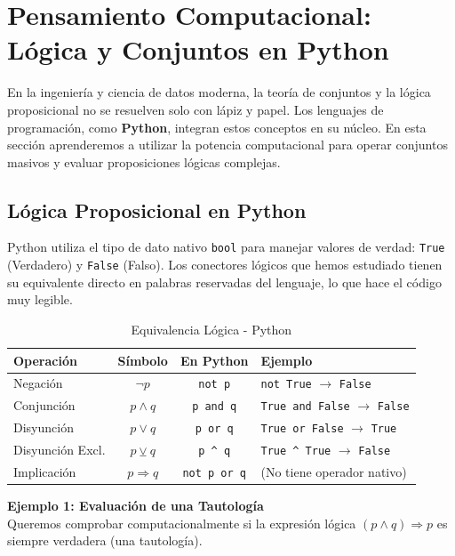 \section{Pensamiento Computacional: Lógica y Conjuntos en Python}

En la ingeniería y ciencia de datos moderna, la teoría de conjuntos y la lógica proposicional no se resuelven solo con lápiz y papel. Los lenguajes de programación, como \textbf{Python}, integran estos conceptos en su núcleo. En esta sección aprenderemos a utilizar la potencia computacional para operar conjuntos masivos y evaluar proposiciones lógicas complejas.

\subsection{Lógica Proposicional en Python}

Python utiliza el tipo de dato nativo \texttt{bool} para manejar valores de verdad: \texttt{True} (Verdadero) y \texttt{False} (Falso). Los conectores lógicos que hemos estudiado tienen su equivalente directo en palabras reservadas del lenguaje, lo que hace el código muy legible.

\begin{table}[ht]
\caption{Equivalencia Lógica - Python}\label{tabla:python_logic}
\centering
\begin{tabular}{|l|c|c|l|}
\hline
\textbf{Operación} & \textbf{Símbolo} & \textbf{En Python} & \textbf{Ejemplo} \\ \hline
Negación & $\lnot p$ & \texttt{not p} & \texttt{not True} $\to$ \texttt{False} \\ \hline
Conjunción & $p \land q$ & \texttt{p and q} & \texttt{True and False} $\to$ \texttt{False} \\ \hline
Disyunción & $p \lor q$ & \texttt{p or q} & \texttt{True or False} $\to$ \texttt{True} \\ \hline
Disyunción Excl. & $p \veebar q$ & \texttt{p \^{} q} & \texttt{True \^{} True} $\to$ \texttt{False} \\ \hline
Implicación & $p \Rightarrow q$ & \texttt{not p or q} & (No tiene operador nativo) \\ \hline
\end{tabular}
\end{table}

\noindent \textbf{Ejemplo 1: Evaluación de una Tautología} \\
Queremos comprobar computacionalmente si la expresión lógica $(p \land q) \Rightarrow p$ es siempre verdadera (una tautología).

